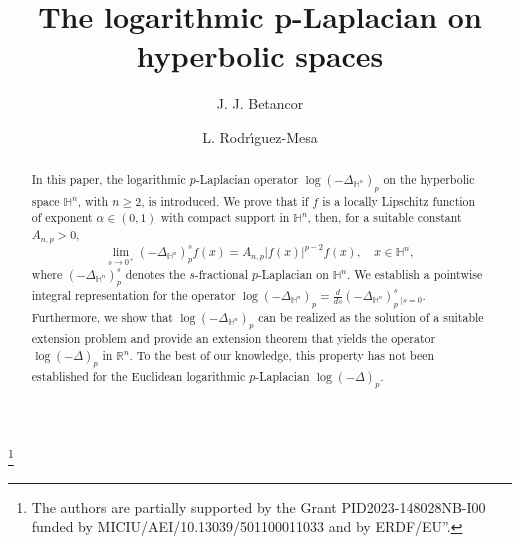 \documentclass[a4paper,10pt, reqno]{amsart}
\theoremstyle{definition}
\theoremstyle{remark}
\numberwithin{equation}{section}
\begin{document}

\title[]{The logarithmic p-Laplacian on hyperbolic spaces}
\author[J. J. Betancor]{J. J. Betancor}


\author[L. Rodr\'{\i}guez-Mesa] {L. Rodr\'{\i}guez-Mesa}


\address{
	Departamento de An\'alisis Matem\'atico, Universidad de La Laguna,\newline
	Campus de Anchieta, Avda. Astrof\'isico S\'anchez, s/n, La Laguna (Sta. Cruz de Tenerife), Spain}


\thanks{The authors are partially supported by the Grant PID2023-148028NB-I00 funded by MICIU/AEI/10.13039/501100011033 and by ERDF/EU”.
}






\begin{abstract}
In this paper, the logarithmic $p$-Laplacian operator $\log (-\Delta_{\mathbb H ^n})_p$ on the hyperbolic space $\mathbb H^n$, with $n\geq 2$, is introduced. We prove that if $f$ is a locally Lipschitz function of exponent $\alpha \in (0,1)$ with compact support in $\mathbb H^n$, then, for a suitable constant  $A_{n,p}>0$,  
$$
\lim_{s\rightarrow 0^+}(-\Delta_{\mathbb H ^n})_p^sf(x)=A_{n,p}|f(x)|^{p-2}f(x),\quad x\in \mathbb H^n,
$$  
where $(-\Delta_{\mathbb H ^n})_p^s$ denotes the $s$-fractional $p$-Laplacian on $\mathbb H^n$. We establish a pointwise integral representation for the operator $\log (-\Delta_{\mathbb H ^n})_p=\frac{d}{ds}(-\Delta_{\mathbb H^n})_p^s\,_{|s=0}$. Furthermore, we show that $\log (-\Delta_{\mathbb H ^n})_p$ can be realized as the solution of a suitable extension problem and provide an extension theorem that yields the operator $\log (-\Delta)_p$ in $\mathbb R^n$. To the best of our knowledge, this property has not been established for the Euclidean logarithmic $p$-Laplacian $\log (-\Delta)_p$. 
\end{abstract}

\maketitle
\end{document}
